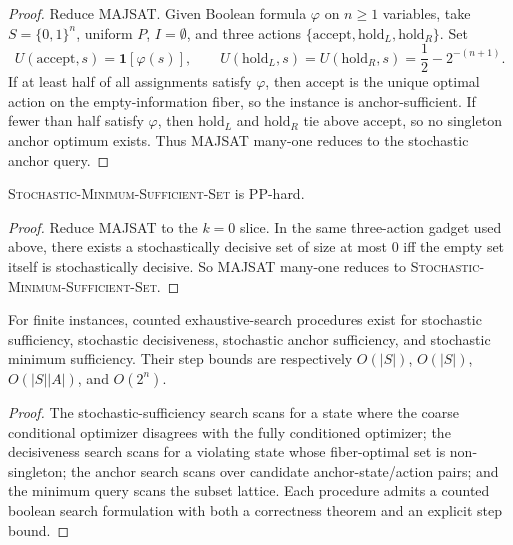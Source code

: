 \begin{proof}
Reduce MAJSAT. Given Boolean formula $\varphi$ on $n\geq 1$ variables, take $S=\{0,1\}^n$, uniform $P$, $I=\emptyset$, and three actions $\{\mathrm{accept},\mathrm{hold}_L,\mathrm{hold}_R\}$. Set
\[
U(\mathrm{accept},s)=\mathbf{1}[\varphi(s)],\qquad
U(\mathrm{hold}_L,s)=U(\mathrm{hold}_R,s)=\frac12-2^{-(n+1)}.
\]
If at least half of all assignments satisfy $\varphi$, then $\mathrm{accept}$ is the unique optimal action on the empty-information fiber, so the instance is anchor-sufficient. If fewer than half satisfy $\varphi$, then $\mathrm{hold}_L$ and $\mathrm{hold}_R$ tie above $\mathrm{accept}$, so no singleton anchor optimum exists. Thus MAJSAT many-one reduces to the stochastic anchor query.
\end{proof}

\begin{theorem}\label{thm:stochastic-minimum-hard}
\textsc{Stochastic-Minimum-Sufficient-Set} is PP-hard.
\end{theorem}


\begin{proof}
Reduce MAJSAT to the $k=0$ slice. In the same three-action gadget used above, there exists a stochastically decisive set of size at most $0$ iff the empty set itself is stochastically decisive. So MAJSAT many-one reduces to \textsc{Stochastic-Minimum-Sufficient-Set}.
\end{proof}

\begin{proposition}\label{prop:stochastic-explicit-search}
For finite instances, counted exhaustive-search procedures exist for stochastic sufficiency, stochastic decisiveness, stochastic anchor sufficiency, and stochastic minimum sufficiency. Their step bounds are respectively $O(|S|)$, $O(|S|)$, $O(|S||A|)$, and $O(2^n)$.
\end{proposition}


\begin{proof}
The stochastic-sufficiency search scans for a state where the coarse conditional optimizer disagrees with the fully conditioned optimizer; the decisiveness search scans for a violating state whose fiber-optimal set is non-singleton; the anchor search scans over candidate anchor-state/action pairs; and the minimum query scans the subset lattice. Each procedure admits a counted boolean search formulation with both a correctness theorem and an explicit step bound.
\end{proof}

